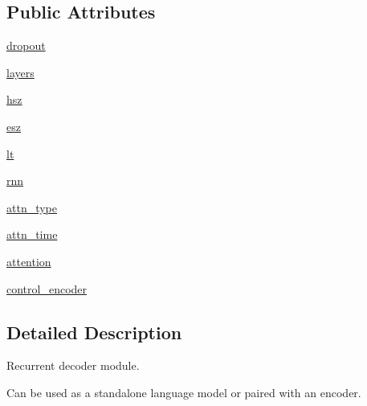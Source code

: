 \subsection*{Public Attributes}
\begin{DoxyCompactItemize}
\item 
\hyperlink{classprojects_1_1controllable__dialogue_1_1controllable__seq2seq_1_1modules_1_1RNNDecoder_a15066218704d830955daf5172ac26701}{dropout}
\item 
\hyperlink{classprojects_1_1controllable__dialogue_1_1controllable__seq2seq_1_1modules_1_1RNNDecoder_a74a554d5f0e2b4a2a1c81dd61f4e9056}{layers}
\item 
\hyperlink{classprojects_1_1controllable__dialogue_1_1controllable__seq2seq_1_1modules_1_1RNNDecoder_a4b9d534ae41ab01760bc2b54765c8173}{hsz}
\item 
\hyperlink{classprojects_1_1controllable__dialogue_1_1controllable__seq2seq_1_1modules_1_1RNNDecoder_a7361d8832e9c6e4bc57f7c370bccb6b2}{esz}
\item 
\hyperlink{classprojects_1_1controllable__dialogue_1_1controllable__seq2seq_1_1modules_1_1RNNDecoder_a97c8486799dcd727832071666399066b}{lt}
\item 
\hyperlink{classprojects_1_1controllable__dialogue_1_1controllable__seq2seq_1_1modules_1_1RNNDecoder_a5e55e3e3d33925663a7ea879983a0111}{rnn}
\item 
\hyperlink{classprojects_1_1controllable__dialogue_1_1controllable__seq2seq_1_1modules_1_1RNNDecoder_a2f0dcf7e68029eab9e2d67336aee861f}{attn\+\_\+type}
\item 
\hyperlink{classprojects_1_1controllable__dialogue_1_1controllable__seq2seq_1_1modules_1_1RNNDecoder_a96bf4b50c8f4532bd1d4ea921556a51a}{attn\+\_\+time}
\item 
\hyperlink{classprojects_1_1controllable__dialogue_1_1controllable__seq2seq_1_1modules_1_1RNNDecoder_ada39bd45e4c06215de77708c71ac49ef}{attention}
\item 
\hyperlink{classprojects_1_1controllable__dialogue_1_1controllable__seq2seq_1_1modules_1_1RNNDecoder_a01d175c0f4c02aabbba6a140c1a44905}{control\+\_\+encoder}
\end{DoxyCompactItemize}


\subsection{Detailed Description}
\begin{DoxyVerb}Recurrent decoder module.

Can be used as a standalone language model or paired with an encoder.
\end{DoxyVerb}
 

